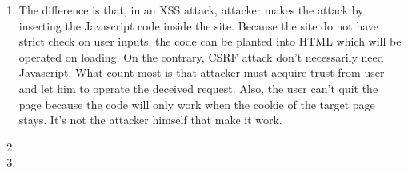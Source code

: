 \begin{enumerate}
	\item The difference is that, in an XSS attack, attacker makes the attack by inserting the  Javascript code inside the site. Because the site do not have strict check on user inputs, the code can be planted into HTML which will be operated on loading. On the contrary, CSRF attack don't necessarily need Javascript. What count most is that attacker must acquire trust from user and let him to operate the deceived request. Also, the user can't quit the page because the code will only work when the cookie of the target page stays. It's not the attacker himself that make it work.

\item \highergradesonly
\item \highergradesonly
\end{enumerate}
